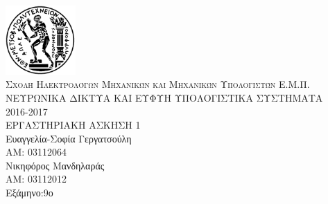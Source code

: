 \documentclass[12pt]{article}
\date{}
\begin{document}
\begin{titlepage}
\date{}
\begin{center}
\includegraphics[width=0.2\textwidth]{logo_ntua.jpg}\\

\textsc{\LARGE Σχολή Ηλεκτρολόγων Μηχανικών και Μηχανικών Υπολογιστών Ε.Μ.Π.}\\[1.5cm]
\LARGE
ΝΕΥΡΩΝΙΚΑ ΔΙΚΤΥΑ ΚΑΙ ΕΥΦΥΗ ΥΠΟΛΟΓΙΣΤΙΚΑ ΣΥΣΤΗΜΑΤΑ\\
2016-2017\\
\vfill
ΕΡΓΑΣΤΗΡΙΑΚΗ ΑΣΚΗΣΗ 1\\
\vfill
Ευαγγελία-Σοφία Γεργατσούλη\\
ΑΜ: 03112064\\
Νικηφόρος Μανδηλαράς\\
ΑΜ: 03112012\\
Εξάμηνο:9ο\\
\vfill
\end{center}
\end{titlepage}
\newpage
\end{document}
